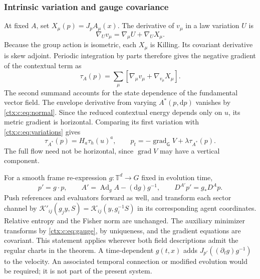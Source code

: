 \subsubsection{Intrinsic variation and gauge covariance}

At fixed $A$, set $X_\mu(p)=J_pA_\mu(x)$. The derivative of $v_\mu$ in a law variation $U$ is
\begin{equation}
 \nabla_Uv_\mu=\nabla_\mu U+\nabla_UX_\mu.
\end{equation}
Because the group action is isometric, each $X_\mu$ is Killing. Its covariant derivative is skew adjoint. Periodic integration by parts therefore gives the negative gradient of the contextual term as
\begin{equation}
 \tau_A(p)=\sum_\mu\left[\nabla_\mu v_\mu+
                                    \nabla_{v_\mu}X_\mu\right].
 \label{ctx:c:eq:tauA}
\end{equation}
The second summand accounts for the state dependence of the fundamental vector field. The envelope derivative from varying $A^*(p,\mathrm d p)$ vanishes by \cref{ctx:c:eq:normal}. Since the reduced contextual energy depends only on $u$, its metric gradient is horizontal. Comparing its first variation with \cref{ctx:c:eq:variations} gives
\begin{equation}
 \tau_{A^*}(p)=H_a\tau_h(u)^a,
 \qquad p_t=-\operatorname{grad}_{\mathsf G}V+\lambda\tau_{A^*}(p).
 \label{ctx:c:eq:intrinsic}
\end{equation}
The full flow need not be horizontal, since $\operatorname{grad} V$ may have a vertical component.

For a smooth frame re-expression $g:\mathbb T^d\to G$ fixed in evolution time,
\begin{equation}
 p'=g\cdot p,\qquad
 A'=\operatorname{Ad}_gA-(\mathrm d g)g^{-1},\qquad
 D^{A'}p'=g_*D^Ap.
 \label{ctx:c:eq:gauge}
\end{equation}
Push references and evaluators forward as well, and transform each sector channel by
$\mathcal K'_{ij}(g_jy,S)=\mathcal K_{ij}(y,g_i^{-1}S)$
in its corresponding agent coordinates. Relative entropy and the Fisher norm are unchanged. The auxiliary minimizer transforms by \cref{ctx:c:eq:gauge}, by uniqueness, and the gradient equations are covariant. This statement applies wherever both field descriptions admit the regular charts in the theorem. A time-dependent $g(t,x)$ adds $J_{p'}((\partial_tg)g^{-1})$ to the velocity. An associated temporal connection or modified evolution would be required; it is not part of the present system.

